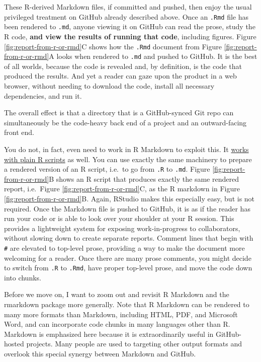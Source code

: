 \documentclass[12pt]{article}
\begin{document}
These R-derived Markdown files, if committed and pushed, then enjoy the
usual privileged treatment on GitHub already described above. Once an
\texttt{.Rmd} file has been rendered to \texttt{.md}, anyone viewing it
on GitHub can read the prose, study the R code, \textbf{and view the
results of running that code}, including figures. Figure
\ref{fig:report-from-r-or-rmd}C shows how the \texttt{.Rmd} document
from Figure \ref{fig:report-from-r-or-rmd}A looks when rendered to
\texttt{.md} and pushed to GitHub. It is the best of all worlds, because
the code is revealed and, by definition, is the code that produced the
results. And yet a reader can gaze upon the product in a web browser,
without needing to download the code, install all necessary
dependencies, and run it.

The overall effect is that a directory that is a GitHub-synced Git repo
can simultaneously be the code-heavy back end of a project and an
outward-facing front end.

You do not, in fact, even need to work in R Markdown to exploit this. It
\href{http://rmarkdown.rstudio.com/articles_report_from_r_script.html}{works
with plain R scripts} as well. You can use exactly the same machinery to
prepare a rendered version of an R script, i.e.~to go from \texttt{.R}
to \texttt{.md}. Figure \ref{fig:report-from-r-or-rmd}B shows an R
script that produces exactly the same rendered report, i.e.~Figure
\ref{fig:report-from-r-or-rmd}C, as the R markdown in Figure
\ref{fig:report-from-r-or-rmd}B. Again, RStudio makes this especially
easy, but is not required. Once the Markdown file is pushed to GitHub,
it is as if the reader has run your code or is able to look over your
shoulder at your R session. This provides a lightweight system for
exposing work-in-progress to collaborators, without slowing down to
create separate reports. Comment lines that begin with
\texttt{\#\textquotesingle{}} are elevated to top-level prose, providing
a way to make the document more welcoming for a reader. Once there are
many prose comments, you might decide to switch from \texttt{.R} to
\texttt{.Rmd}, have proper top-level prose, and move the code down into
chunks.

Before we move on, I want to zoom out and revisit R Markdown and the
rmarkdown package more generally. Note that R Markdown can be rendered
to many more formats than Markdown, including HTML, PDF, and Microsoft
Word, and can incorporate code chunks in many languages other than R.
Markdown is emphasized here because it is extraordinarily useful in
GitHub-hosted projects. Many people are used to targeting other output
formats and overlook this special synergy between Markdown and GitHub.
\end{document}
